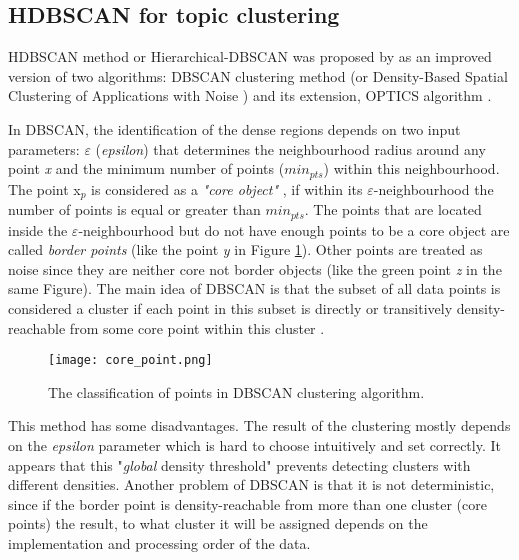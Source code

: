 \documentclass[fontsize=12pt,a4paper,twoside,openany]{scrbook}
\begin{document}
\subsection{HDBSCAN for topic clustering}
\label{sec:HDBSCAN}

HDBSCAN method or Hierarchical-DBSCAN was proposed by \parencite{Campello13, Campello15} as an improved version of two algorithms: DBSCAN clustering method (or Density-Based Spatial Clustering of Applications with Noise \parencite{Ester96}) and its extension, OPTICS algorithm \parencite{Ankerst99}.

In DBSCAN, the identification of the dense regions depends on two input parameters:  \(\varepsilon\) (\emph{epsilon}) that determines the neighbourhood radius around any point \emph{x} and the minimum number of points (\(min_{pts}\)) within this neighbourhood. The point x\(_p\) is considered as a \emph{"core object"} \parencite{Campello13}, if within its \(\varepsilon\)-neighbourhood the number of points is equal or greater than \(min_{pts}\). The points that are located inside the \(\varepsilon\)-neighbourhood but do not have enough points to be a core object are called \emph{border points} (like the point \emph{y} in Figure \ref{fig:core_point}). Other points are treated as noise since they are neither core not border objects (like the green point \emph{z} in the same Figure). The main idea of DBSCAN is that the subset of all data points is considered a cluster if each point in this subset is directly or transitively density-reachable from some core point within this cluster \parencite{Ester96}.

\begin{figure}[h]
\centering
\texttt{[image: core\_point.png]}
\caption{The classification of points in DBSCAN clustering algorithm.}
\label{fig:core_point}
\end{figure}

This method has some disadvantages. The result of the clustering mostly depends on the \emph{epsilon} parameter which is hard to choose intuitively and set correctly. It appears that this "\emph{global} density threshold" \parencite{Malzer20} prevents detecting clusters with different densities. Another problem of DBSCAN is that it is not deterministic, since if the border point is density-reachable from more than one cluster (core points) the result, to what cluster it will be assigned depends on the implementation and processing order of the data. 
\end{document}
